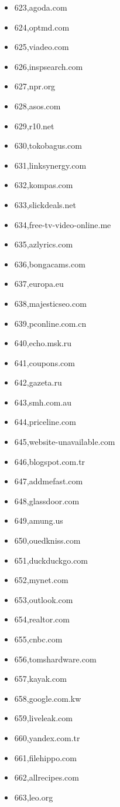 \begin{multicols}{3}
\begin{itemize}
	\item 623,agoda.com
	\item 624,optmd.com
	\item 625,viadeo.com
	\item 626,inspsearch.com
	\item 627,npr.org
	\item 628,asos.com
	\item 629,r10.net
	\item 630,tokobagus.com
	\item 631,linksynergy.com
	\item 632,kompas.com
	\item 633,slickdeals.net
	\item 634,free-tv-video-online.me
	\item 635,azlyrics.com
	\item 636,bongacams.com
	\item 637,europa.eu
	\item 638,majesticseo.com
	\item 639,pconline.com.cn
	\item 640,echo.msk.ru
	\item 641,coupons.com
	\item 642,gazeta.ru
	\item 643,smh.com.au
	\item 644,priceline.com
	\item 645,website-unavailable.com
	\item 646,blogspot.com.tr
	\item 647,addmefast.com
	\item 648,glassdoor.com
	\item 649,amung.us
	\item 650,ouedkniss.com
	\item 651,duckduckgo.com
	\item 652,mynet.com
	\item 653,outlook.com
	\item 654,realtor.com
	\item 655,cnbc.com
	\item 656,tomshardware.com
	\item 657,kayak.com
	\item 658,google.com.kw
	\item 659,liveleak.com
	\item 660,yandex.com.tr
	\item 661,filehippo.com
	\item 662,allrecipes.com
	\item 663,leo.org

\end{itemize}
\end{multicols}
